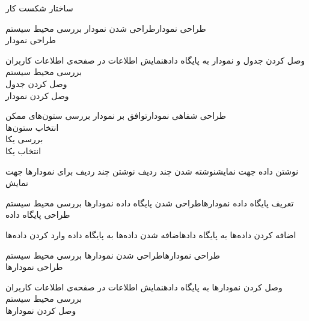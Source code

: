\begin{wbsbox}{ساختار شکست کار}
\begin{wbssub}{طراحی نمودار}{طراحی شدن نمودار}
\task بررسی محیط سیستم  \\
\task طراحی نمودار
\end{wbssub}

\begin{wbssub}{وصل کردن جدول و نمودار به پایگاه داده}{نمایش اطلاعات در صفحه‌ی اطلاعات کاربران}
\task بررسی محیط سیستم  \\
\task وصل کردن جدول \\
\task وصل کردن نمودار
\end{wbssub}

\begin{wbssub}{طراحی شفاهی نمودار}{توافق بر نمودار}
\task بررسی ستون‌های ممکن \\
\task انتخاب ستون‌ها \\
\task بررسی یکا \\
\task انتخاب یکا
\end{wbssub}

\begin{wbssub}{نوشتن داده جهت نمایش}{نوشته شدن چند ردیف}
\task نوشتن چند ردیف برای نمودارها جهت نمایش
\end{wbssub}

\begin{wbssub}{تعریف پایگاه داده نمودارها}{طراحی شدن پایگاه داده نمودارها}
\task بررسی محیط سیستم  \\
\task طراحی پایگاه داده
\end{wbssub}

\begin{wbssub}{اضافه کردن داده‌ها به پایگاه داده}{اضافه شدن داده‌ها به پایگاه داده}
\task وارد کردن داده‌ها
\end{wbssub}

\begin{wbssub}{طراحی نمودارها}{طراحی شدن نمودارها}
\task بررسی محیط سیستم  \\
\task طراحی نمودار‌ها
\end{wbssub}

\begin{wbssub}{وصل کردن نمودارها به پایگاه داده}{نمایش اطلاعات در صفحه‌ی اطلاعات کاربران}
\task بررسی محیط سیستم  \\
\task وصل کردن نمودارها
\end{wbssub}

\end{wbsbox}
